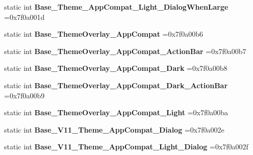 \begin{DoxyCompactItemize}
static int {\bfseries Base\+\_\+\+Theme\+\_\+\+App\+Compat\+\_\+\+Light\+\_\+\+Dialog\+When\+Large} =0x7f0a001d
\item 
\mbox{\label{classandroid_1_1support_1_1v4_1_1R_1_1style_ab95b065cc6e80d4f7d550a650037b60d}} 
static int {\bfseries Base\+\_\+\+Theme\+Overlay\+\_\+\+App\+Compat} =0x7f0a00b6
\item 
\mbox{\label{classandroid_1_1support_1_1v4_1_1R_1_1style_accf0ca715f866fb07aee8aec027cd024}} 
static int {\bfseries Base\+\_\+\+Theme\+Overlay\+\_\+\+App\+Compat\+\_\+\+Action\+Bar} =0x7f0a00b7
\item 
\mbox{\label{classandroid_1_1support_1_1v4_1_1R_1_1style_a3567efa27b07ef544d3ef8139f19b401}} 
static int {\bfseries Base\+\_\+\+Theme\+Overlay\+\_\+\+App\+Compat\+\_\+\+Dark} =0x7f0a00b8
\item 
\mbox{\label{classandroid_1_1support_1_1v4_1_1R_1_1style_a606c278256172ed5caf20ee6045ad281}} 
static int {\bfseries Base\+\_\+\+Theme\+Overlay\+\_\+\+App\+Compat\+\_\+\+Dark\+\_\+\+Action\+Bar} =0x7f0a00b9
\item 
\mbox{\label{classandroid_1_1support_1_1v4_1_1R_1_1style_aee892f1f0cdb1c9258e78b267e4bf7b2}} 
static int {\bfseries Base\+\_\+\+Theme\+Overlay\+\_\+\+App\+Compat\+\_\+\+Light} =0x7f0a00ba
\item 
\mbox{\label{classandroid_1_1support_1_1v4_1_1R_1_1style_ae0221335b9c929fa4c6fe4e0d24a17e0}} 
static int {\bfseries Base\+\_\+\+V11\+\_\+\+Theme\+\_\+\+App\+Compat\+\_\+\+Dialog} =0x7f0a002e
\item 
\mbox{\label{classandroid_1_1support_1_1v4_1_1R_1_1style_a96840db93a8c8cf07004773a408f69f3}} 
static int {\bfseries Base\+\_\+\+V11\+\_\+\+Theme\+\_\+\+App\+Compat\+\_\+\+Light\+\_\+\+Dialog} =0x7f0a002f
\item 
\mbox{\label{classandroid_1_1support_1_1v4_1_1R_1_1style_accf8cdd0ced5ea075b315dc6d7ae2947}} 

\end{DoxyCompactItemize}
